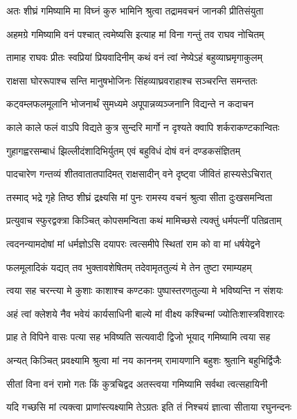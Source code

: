 \twolineshloka
{अतः शीघ्रं गमिष्यामि मा विघ्नं कुरु भामिनि}
{श्रुत्वा तद्रामवचनं जानकी प्रीतिसंयुता} %

\twolineshloka
{अहमग्रे गमिष्यामि वनं पश्चात् त्वमेष्यसि}
{इत्याह मां विना गन्तुं तव राघव नोचितम्} %

\twolineshloka
{तामाह राघवः प्रीतः स्वप्रियां प्रियवादिनीम्}
{कथं वनं त्वां नेष्येऽहं बहुव्याघ्रमृगाकुलम्} %

\twolineshloka
{राक्षसा घोररूपाश्च सन्ति मानुषभोजिनः}
{सिंहव्याघ्रवराहाश्च सञ्चरन्ति समन्ततः} %

\twolineshloka
{कट्वम्लफलमूलानि भोजनार्थं सुमध्यमे}
{अपूपान्नव्यञ्जनानि विद्यन्ते न कदाचन} %

\twolineshloka
{काले काले फलं वाऽपि विद्यते कुत्र सुन्दरि}
{मार्गो न दृश्यते क्वापि शर्कराकण्टकान्वितः} %

\twolineshloka
{गुहागह्वरसम्बाधं झिल्लीदंशादिभिर्युतम्}
{एवं बहुविधं दोषं वनं दण्डकसंज्ञितम्} %

\twolineshloka
{पादचारेण गन्तव्यं शीतवातातपादिमत्}
{राक्षसादीन् वने दृष्ट्वा जीवितं हास्यसेऽचिरात्} %

\twolineshloka
{तस्माद् भद्रे गृहे तिष्ठ शीघ्रं द्रक्ष्यसि मां पुनः}
{रामस्य वचनं श्रुत्वा सीता दुःखसमन्विता} %

\twolineshloka
{प्रत्युवाच स्फुरद्वक्त्रा किञ्चित् कोपसमन्विता}
{कथं मामिच्छसे त्यक्तुं धर्मपत्नीं पतिव्रताम्} %

\twolineshloka
{त्वदनन्यामदोषां मां धर्मज्ञोऽसि दयापरः}
{त्वत्समीपे स्थितां राम को वा मां धर्षयेद्वने} %

\twolineshloka
{फलमूलादिकं यद्यत् तव भुक्तावशेषितम्}
{तदेवामृततुल्यं मे तेन तुष्टा रमाम्यहम्} %

\twolineshloka
{त्वया सह चरन्त्या मे कुशाः काशाश्च कण्टकाः}
{पुष्पास्तरणतुल्या मे भविष्यन्ति न संशयः} %

\twolineshloka
{अहं त्वां क्लेशये नैव भवेयं कार्यसाधिनी}
{बाल्ये मां वीक्ष्य कश्चिन्मां ज्योतिःशास्त्रविशारदः} %

\twolineshloka
{प्राह ते विपिने वासः पत्या सह भविष्यति}
{सत्यवादी द्विजो भूयाद् गमिष्यामि त्वया सह} %

\twolineshloka
{अन्यत् किञ्चित् प्रवक्ष्यामि श्रुत्वा मां नय काननम्}
{रामायणानि बहुशः श्रुतानि बहुभिर्द्विजैः} %

\twolineshloka
{सीतां विना वनं रामो गतः किं कुत्रचिद्वद}
{अतस्त्वया गमिष्यामि सर्वथा त्वत्सहायिनी} %

\twolineshloka
{यदि गच्छसि मां त्यक्त्वा प्राणांस्त्यक्ष्यामि तेऽग्रतः}
{इति तं निश्चयं ज्ञात्वा सीताया रघुनन्दनः} %

